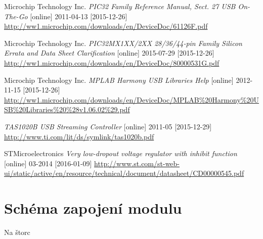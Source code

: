 \documentclass[bc,male,c,dept460]{diploma}						%
\begin{document}
\begin{thebibliography}{99}
 Microchip Technology Inc.
\textit{PIC32 Family Reference Manual, Sect. 27 USB On-The-Go} [online] 2011-04-13 [2015-12-26]
\url{http://ww1.microchip.com/downloads/en/DeviceDoc/61126F.pdf}

 Microchip Technology Inc.
\textit{PIC32MX1XX/2XX 28/36/44-pin Family Silicon Errata and Data Sheet Clarification} [online] 2015-07-29 [2015-12-26]
\url{http://ww1.microchip.com/downloads/en/DeviceDoc/80000531G.pdf}

 Microchip Technology Inc.
\textit{MPLAB Harmony USB Libraries Help} [online] 2012-11-15 [2015-12-26]
\url{http://ww1.microchip.com/downloads/en/DeviceDoc/MPLAB\%20Harmony\%20USB\%20Libraries\%20\%28v1.06.02\%29.pdf}

\textit{TAS1020B USB Streaming Controller} [online] 2011-05 [2015-12-29]
\url{http://www.ti.com/lit/ds/symlink/tas1020b.pdf} 

 STMicroelectronics
\textit{Very low-dropout voltage regulator with inhibit function} [online] 03-2014 [2016-01-09]
\url{http://www.st.com/st-web-ui/static/active/en/resource/technical/document/datasheet/CD00000545.pdf}
\end{thebibliography}


\appendix

\section{Schéma zapojení modulu}
\begin{landscape}
Na štorc
\end{landscape}

\clearpage

\end{document}
